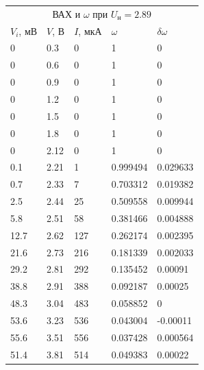 \documentclass[%
 reprint,
 amsmath,amssymb,
 aps,
]{revtex4-2}
\begin{document}
\begin{table}[h!]
	\begin{tabular}{|l|l|l|l|l|}
		\hline
		\multicolumn{5}{|c|}{\multirow{2}{*}{ВАХ и $\omega$ при $U_\text{н} = 2.89$}} \\
		\multicolumn{5}{|c|}{}                                       \\ \hline
		$V_i$, мВ    & $V$, В     & $I$, мкА    & $\omega$          & $\delta\omega$          \\ \hline
		0         & 0.3      & 0         & 1           & 0           \\ \hline
		0         & 0.6      & 0         & 1           & 0           \\ \hline
		0         & 0.9      & 0         & 1           & 0           \\ \hline
		0         & 1.2      & 0         & 1           & 0           \\ \hline
		0         & 1.5      & 0         & 1           & 0           \\ \hline
		0         & 1.8      & 0         & 1           & 0           \\ \hline
		0         & 2.12     & 0         & 1           & 0           \\ \hline
		0.1       & 2.21     & 1         & 0.999494    & 0.029633    \\ \hline
		0.7       & 2.33     & 7         & 0.703312    & 0.019382    \\ \hline
		2.5       & 2.44     & 25        & 0.509558    & 0.009944    \\ \hline
		5.8       & 2.51     & 58        & 0.381466    & 0.004888    \\ \hline
		12.7      & 2.62     & 127       & 0.262174    & 0.002395    \\ \hline
		21.6      & 2.73     & 216       & 0.181339    & 0.002033    \\ \hline
		29.2      & 2.81     & 292       & 0.135452    & 0.00091     \\ \hline
		38.8      & 2.91     & 388       & 0.092187    & 0.00025     \\ \hline
		48.3      & 3.04     & 483       & 0.058852    & 0           \\ \hline
		53.6      & 3.23     & 536       & 0.043004    & -0.00011    \\ \hline
		55.6      & 3.51     & 556       & 0.037428    & 0.000564    \\ \hline
		51.4      & 3.81     & 514       & 0.049383    & 0.00022     \\ \hline

\end{tabular}
\end{table}
\end{document}
